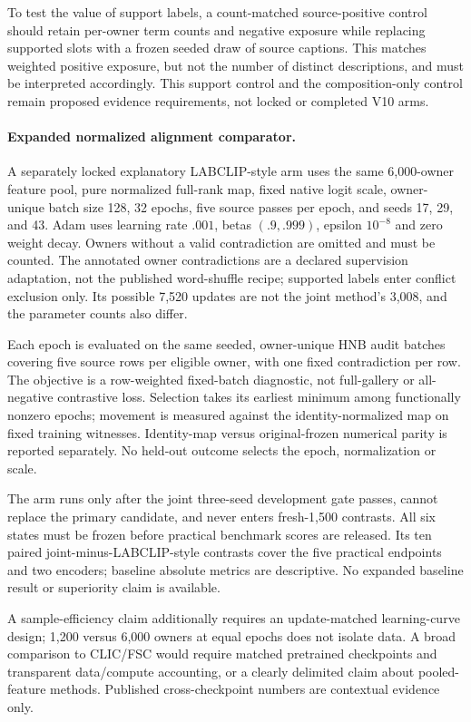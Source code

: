 \documentclass[11pt]{article}
\begin{document}
To test the value of support labels, a count-matched source-positive
control should retain per-owner term counts and negative exposure while
replacing supported slots with a frozen seeded draw of source captions.
This matches weighted positive exposure, but not the number of distinct
descriptions, and must be interpreted accordingly. This support control
and the composition-only control remain proposed evidence requirements,
not locked or completed V10 arms.

\newpage
\paragraph{Expanded normalized alignment comparator.}
A separately locked explanatory LABCLIP-style arm uses the same 6,000-owner
feature pool, pure normalized full-rank map, fixed native logit scale,
owner-unique batch size 128, 32 epochs, five source passes per epoch, and
seeds 17, 29, and 43. Adam uses learning rate $.001$, betas $(.9,.999)$,
epsilon $10^{-8}$ and zero weight decay. Owners without a valid contradiction
are omitted and must be counted. The annotated owner contradictions are a
declared supervision adaptation, not the published word-shuffle recipe;
supported labels enter conflict exclusion only. Its possible 7,520 updates
are not the joint method's 3,008, and the parameter counts also differ.

Each epoch is evaluated on the same seeded, owner-unique HNB audit batches
covering five source rows per eligible owner, with one fixed contradiction
per row. The objective is a row-weighted fixed-batch diagnostic, not
full-gallery or all-negative contrastive loss. Selection takes its earliest
minimum among functionally nonzero epochs; movement is measured against
the identity-normalized map on fixed training witnesses. Identity-map
versus original-frozen numerical parity is reported separately. No held-out outcome
selects the epoch, normalization or scale.

The arm runs only after the joint three-seed development gate passes,
cannot replace the primary candidate, and never enters fresh-1,500
contrasts. All six states must be frozen before practical benchmark scores
are released. Its ten paired joint-minus-LABCLIP-style contrasts cover the
five practical endpoints and two encoders; baseline absolute metrics are
descriptive. No expanded baseline result or superiority claim is available.

A sample-efficiency claim additionally requires an update-matched
learning-curve design; 1,200 versus 6,000 owners at equal epochs does not
isolate data. A broad comparison to CLIC/FSC would require matched
pretrained checkpoints and transparent data/compute accounting, or a
clearly delimited claim about pooled-feature methods. Published
cross-checkpoint numbers are contextual evidence only.
\end{document}
